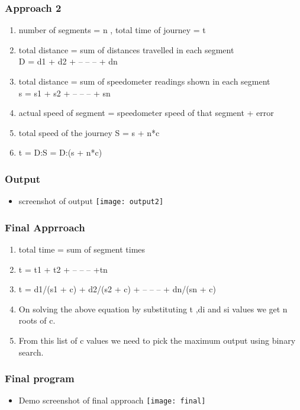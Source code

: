 \documentclass{beamer}
\begin{document}
    \begin{frame}
            \frametitle{Approach 2}
            \begin{enumerate}
                    \item number of segments = n , total time of journey = t
                    \item total distance = sum of distances travelled in each segment\\D = d1 + d2 + -- -- -- + dn
                    \item total distance = sum of speedometer readings shown in each segment\\s = s1 + s2 + -- -- -- + sn
                    \item actual speed of segment = speedometer speed of that segment + error
                    \item total speed of the journey S = s + n*c
                    \item t = D:S = D:(s + n*c)
            \end{enumerate}
    \end{frame}

    \begin{frame}
            \frametitle{Output}
            \begin{itemize}
                    \item screenshot of output
                            \texttt{[image: output2]}
            \end{itemize}
    \end{frame}

    \begin{frame}
	    \frametitle{Final Apprroach}
	    \begin{enumerate}
	    	    \item total time = sum of segment times
	    	    \item t = t1 + t2 + – – – +tn
	    	    \item t = d1/(s1 + c) + d2/(s2 + c) + – – – + dn/(sn + c)
	    	    \item On solving the above equation by substituting t ,di and si values we get n roots of c.
	    	    \item From this list of c values we need to pick the maximum output using binary search.
	    \end{enumerate}
    \end{frame}

    \begin{frame}
            \frametitle{Final program}
            \begin{itemize}
                \item Demo screenshot of final approach
                        \texttt{[image: final]}
            \end{itemize}
    \end{frame}
\end{document}
